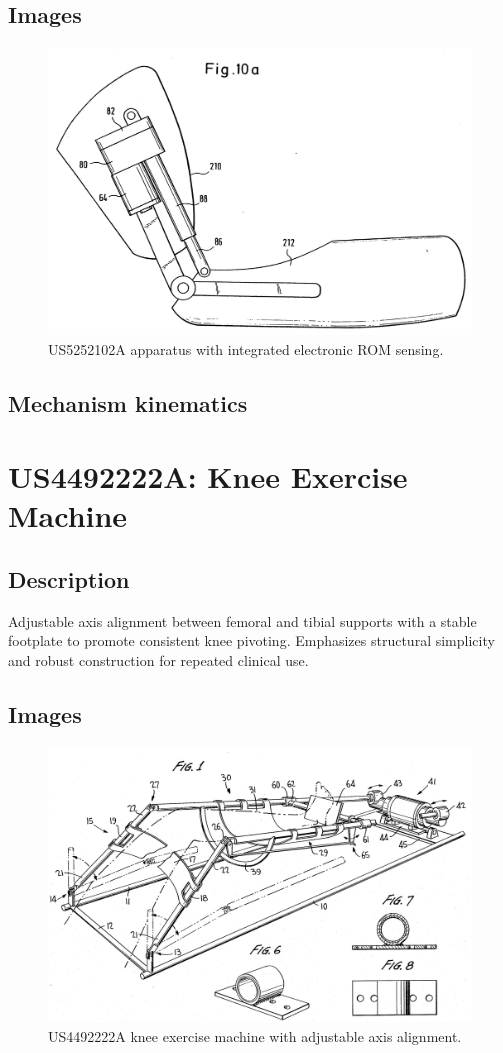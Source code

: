 \documentclass[11pt]{article}
\begin{document}
\subsection{Images}
\begin{figure}[H]
  \centering
  \includegraphics[width=0.54\linewidth]{US5252102_1.png}
  \caption{US5252102A apparatus with integrated electronic ROM sensing.}
  \label{fig:US5252102A}
\end{figure}

\subsection{Mechanism kinematics}

\section{US4492222A: Knee Exercise Machine}
\subsection{Description}
Adjustable axis alignment between femoral and tibial supports with a stable footplate to promote consistent knee pivoting. Emphasizes structural simplicity and robust construction for repeated clinical use.
\subsection{Images}
\begin{figure}[H]
  \centering
  \includegraphics[width=0.54\linewidth]{4492222A_1.png}
  \caption{US4492222A knee exercise machine with adjustable axis alignment.}
  \label{fig:US4492222A}
\end{figure}
\end{document}
